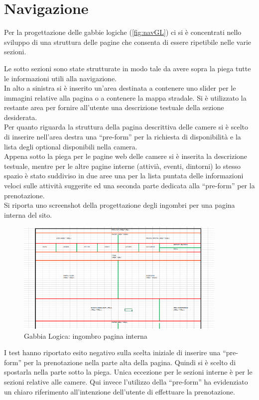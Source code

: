 \documentclass[a4paper,12pt,hidelinks]{report}
\begin{document}
\section*{Navigazione}
Per la progettazione delle gabbie logiche (\autoref{fig:navGL}) ci si è concentrati nello sviluppo di una struttura delle pagine che consenta di essere ripetibile nelle varie sezioni.
\par Le sotto sezioni sono state strutturate in modo tale da avere sopra la piega tutte le informazioni utili alla navigazione. 
\\In alto a sinistra si è inserito un'area destinata a contenere uno slider per le immagini relative alla pagina o a contenere la mappa stradale.
Si è utilizzato la restante area per fornire all'utente una descrizione testuale della sezione desiderata. 
\\Per quanto riguarda la struttura della pagina descrittiva delle camere si è scelto di inserire nell'area destra una ``pre-form'' per la richiesta di disponibilità e la lista degli optional disponibili nella camera.
\\Appena sotto la piega per le pagine web delle camere si è inserita la descrizione testuale, mentre per le altre pagine interne (attivià, eventi, dintorni) lo stesso spazio è stato suddiviso
in due aree una per la lista puntata delle informazioni veloci sulle attività suggerite ed una seconda parte dedicata alla ``pre-form'' per la prenotazione.
\\Si riporta uno screenshot della progettazione degli ingombri per una pagina interna del sito.
\begin{figure}[h!]%
    \includegraphics[width=0.9\textwidth,keepaspectratio=true]{../../img/navGabbieLogiche}
    \centering
    \caption{Gabbia Logica: ingombro pagina interna}%
    \label{fig:navGL}%
\end{figure}
\newline 
I test hanno riportato esito negativo sulla scelta iniziale di inserire una ``pre-form'' per la prenotazione nella parte alta della pagina. Quindi si è scelto di spostarla nella parte 
sotto la piega. Unica eccezione per le sezioni interne è per le sezioni relative alle camere. Qui invece l'utilizzo della ``pre-form'' ha evidenziato un chiaro riferimento all'intenzione dell'utente
di effettuare la prenotazione.
\end{document}
